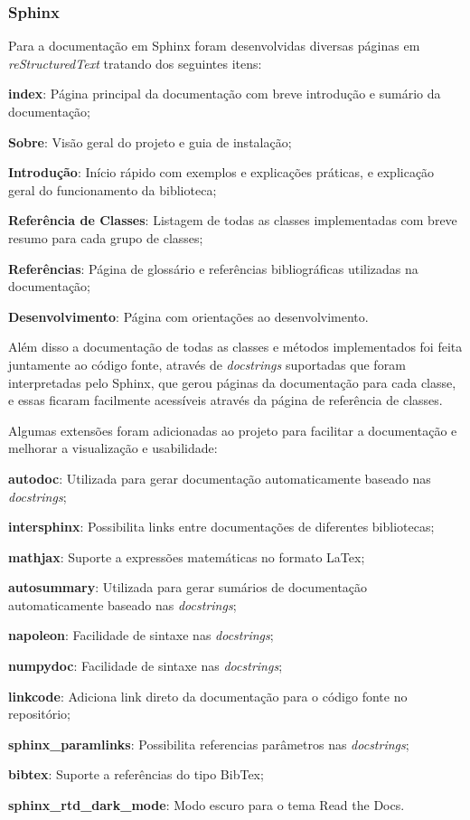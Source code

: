 \subsubsection{Sphinx}

Para a documentação em Sphinx foram desenvolvidas diversas páginas em \textit{reStructuredText} tratando dos seguintes itens:
\begin{alineas}
    \item \textbf{index}: Página principal da documentação com breve introdução e sumário da documentação;
    \item \textbf{Sobre}: Visão geral do projeto e guia de instalação;
    \item \textbf{Introdução}: Início rápido com exemplos e explicações práticas, e explicação geral do funcionamento da biblioteca;
    \item \textbf{Referência de Classes}: Listagem de todas as classes implementadas com breve resumo para cada grupo de classes;
    \item \textbf{Referências}: Página de glossário e referências bibliográficas utilizadas na documentação;
    \item \textbf{Desenvolvimento}: Página com orientações ao desenvolvimento.
\end{alineas}

Além disso a documentação de todas as classes e métodos implementados foi feita juntamente ao código fonte, através de
\textit{docstrings} suportadas que foram interpretadas pelo Sphinx, que gerou páginas da documentação para cada classe, e essas
ficaram facilmente acessíveis através da página de referência de classes.

Algumas extensões foram adicionadas ao projeto para facilitar a documentação e melhorar a visualização e usabilidade:

\begin{alineas}
    \item \textbf{autodoc}: Utilizada para gerar documentação automaticamente baseado nas \textit{docstrings};
    \item \textbf{intersphinx}: Possibilita links entre documentações de diferentes bibliotecas;
    \item \textbf{mathjax}: Suporte a expressões matemáticas no formato LaTex;
    \item \textbf{autosummary}: Utilizada para gerar sumários de documentação automaticamente baseado nas \textit{docstrings};
    \item \textbf{napoleon}: Facilidade de sintaxe nas \textit{docstrings};
    \item \textbf{numpydoc}: Facilidade de sintaxe nas \textit{docstrings};
    \item \textbf{linkcode}: Adiciona link direto da documentação para o código fonte no repositório;
    \item \textbf{sphinx\_paramlinks}: Possibilita referencias parâmetros nas \textit{docstrings};
    \item \textbf{bibtex}: Suporte a referências do tipo BibTex;
    \item \textbf{sphinx\_rtd\_dark\_mode}: Modo escuro para o tema Read the Docs.
\end{alineas}

